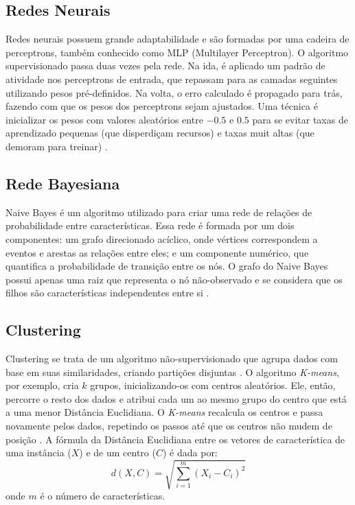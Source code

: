     \subsection{Redes Neurais}
    Redes neurais possuem grande adaptabilidade e são formadas por uma cadeira de perceptrons, também conhecido como MLP
    (Multilayer Perceptron). O algoritmo supervisionado passa duas vezes pela rede. Na ida, é aplicado um padrão de
    atividade nos perceptrons de entrada, que repassam para as camadas seguintes utilizando pesos pré-definidos. Na volta,
     o erro calculado é propagado para trás, fazendo com que os pesos dos perceptrons sejam ajustados.
     Uma técnica é inicializar os pesos com valores aleatórios entre $-0.5$ e $0.5$ para se evitar taxas de aprendizado
     pequenas (que disperdiçam recursos) e taxas muit altas (que demoram para treinar) \cite{barapatre08}.

    \subsection{Rede Bayesiana}
    Naive Bayes é um algoritmo utilizado para criar uma rede de relações de probabilidade entre características. Essa
    rede é formada por um dois componentes: um grafo direcionado acíclico, onde vértices correspondem a eventos e
    arestas as relações entre eles; e um componente numérico, que quantifica a probabilidade de transição entre os nós.
    O grafo do Naive Bayes possui apenas uma raiz que representa o nó não-observado e se considera que os filhos
    são características independentes entre si \cite{benferhat05}.

    \subsection{Clustering}
     Clustering se trata de um algoritmo não-supervisionado que agrupa dados com base em suas similaridades, criando
      partições disjuntas \cite{ni07}. O algoritmo \emph{K-means}, por exemplo, cria $k$ grupos, inicializando-os com centros
      aleatórios. Ele, então, percorre o resto dos dados e atribui cada um ao mesmo grupo do
      centro que está a uma menor Distância Euclidiana. O \emph{K-means} recalcula os centros e passa novamente pelos dados,
      repetindo os passos até que os centros não mudem de posição \cite{zhang09}. A fórmula da Distância Euclidiana entre
      os vetores de característica de uma instância ($X$) e de um centro ($C$) é dada por:
      $$ d(X,C) = \sqrt{\sum_{i=1}^{m} \left ( X_i - C_i\right )^2} $$
      onde $m$ é o número de características.

